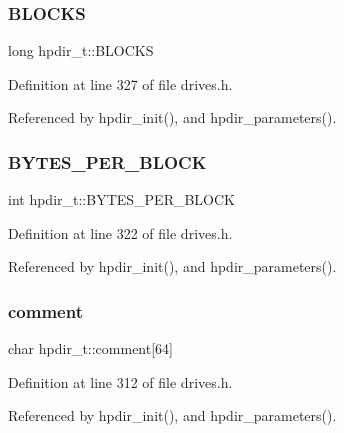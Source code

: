 \subsubsection{\texorpdfstring{B\+L\+O\+C\+KS}{BLOCKS}}
{\footnotesize\ttfamily long hpdir\+\_\+t\+::\+B\+L\+O\+C\+KS}



Definition at line 327 of file drives.\+h.



Referenced by hpdir\+\_\+init(), and hpdir\+\_\+parameters().

\mbox{\label{structhpdir__t_a5b24f184136dbc60d1c2a9f74dcb2956}} 
\subsubsection{\texorpdfstring{B\+Y\+T\+E\+S\+\_\+\+P\+E\+R\+\_\+\+B\+L\+O\+CK}{BYTES\_PER\_BLOCK}}
{\footnotesize\ttfamily int hpdir\+\_\+t\+::\+B\+Y\+T\+E\+S\+\_\+\+P\+E\+R\+\_\+\+B\+L\+O\+CK}



Definition at line 322 of file drives.\+h.



Referenced by hpdir\+\_\+init(), and hpdir\+\_\+parameters().

\mbox{\label{structhpdir__t_aa2ba4f9a627c74e84a515e8ac4893bfb}} 
\subsubsection{\texorpdfstring{comment}{comment}}
{\footnotesize\ttfamily char hpdir\+\_\+t\+::comment\mbox{[}64\mbox{]}}



Definition at line 312 of file drives.\+h.



Referenced by hpdir\+\_\+init(), and hpdir\+\_\+parameters().

\mbox{\label{structhpdir__t_afda568f3e8bf184e9e58c4048fda04e7}} 
